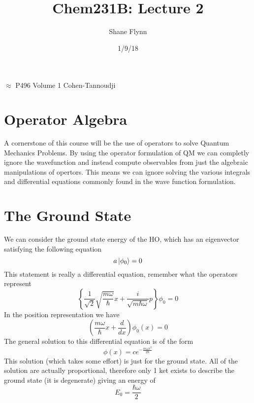 \documentclass{article}
\title{Chem231B: Lecture 2}
\author{Shane Flynn}
\date{1/9/18}
\newcommand{\be}{\begin{equation}}
\newcommand{\ee}{\end{equation}}
\begin{document}
\maketitle

$\approx$ P496 Volume 1 Cohen-Tannoudji
\section*{Operator Algebra}
A cornerstone of this course will be the use of operators to solve Quantum Mechanics Problems. 
By using the operator formulation of QM we can completly ignore the wavefunction and instead compute observables from just the algebraic manipulations of opertors.
This means we can ignore solving the various integrals and differential equations commonly found in the wave function formulation. 

\section*{The Ground State}
We can consider the ground state energy of the HO, which has an eigenvector satisfying the following equation
\be
a\ket{\phi_0} = 0
\ee
This statement is really a differential equation, remember what the operators represent
\be
\left\{\frac{1}{\sqrt{2}} \sqrt{\frac{m\omega}{\hbar}}x + \frac{i}{\sqrt{m\hbar\omega}}p\right\}\phi_0 = 0
\ee
In the position representation  we have
\be
\left(\frac{m\omega}{\hbar}x + \frac{d}{dx}\right)\phi_0(x) = 0
\ee
The general solution to this differential equation is of the form 
\be
\phi(x) = ce^{-\frac{m\omega x^2}{2\hbar}}
\ee
This solution (which takes some effort) is just for the ground state.
All of the solution are actually proportional, therefore only 1 ket exists to describe the ground state (it is degenerate) giving an energy of
\be
E_0 = \frac{\hbar\omega}{2}
\ee
\end{document}
